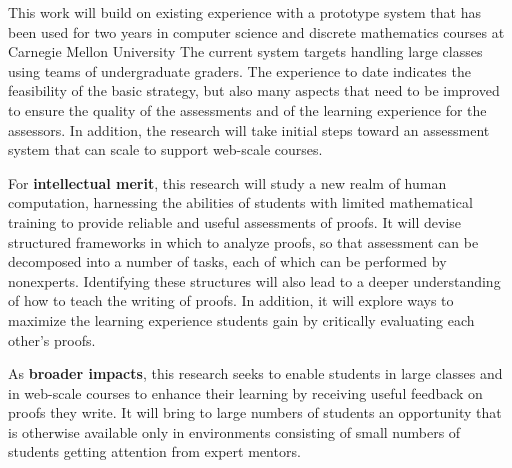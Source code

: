 \documentclass[12pt]{article}
\begin{document}
This work will build on existing experience with a prototype system
that has been used for two years in computer science and discrete
mathematics courses at Carnegie Mellon University The current system
targets handling large classes using teams of undergraduate graders.
The experience to date indicates the feasibility of the basic
strategy, but also many aspects that need to be improved to ensure the
quality of the assessments and of the learning experience for the
assessors.  In addition, the research will take initial steps toward an
assessment system that can scale to support web-scale courses.

For {\bf intellectual merit}, this research will study a new realm of
human computation, harnessing the abilities of students with limited
mathematical training to provide reliable and useful assessments of
proofs.  It will devise structured frameworks in which to analyze
proofs, so that assessment can be decomposed into a number of tasks,
each of which can be performed by nonexperts.  Identifying these
structures will also lead to a deeper understanding of how to teach
the writing of proofs.  In addition, it will explore ways to maximize
the learning experience students gain by critically evaluating each
other's proofs.

As {\bf broader impacts}, this research seeks to enable students in
large classes and in web-scale courses to enhance their learning by
receiving useful feedback on proofs they write.  It will bring to
large numbers of students an opportunity that is otherwise available
only in environments consisting of small numbers of students getting
attention from expert mentors.
\end{document}
